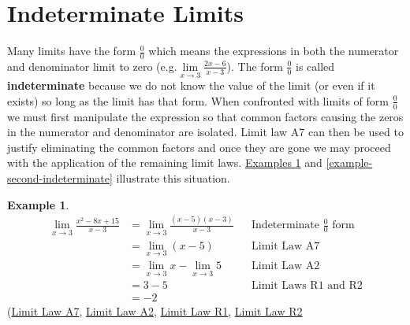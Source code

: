 \documentclass[10pt,oneside,]{book}
\newcommand{\terminology}[1]{\textbf{#1}}
\theoremstyle{plain}
\theoremstyle{definition}
\newtheorem{example}[theorem]{Example}
\numberwithin{equation}{section}
\begin{document}
\section[Indeterminate Limits]{Indeterminate Limits}\label{section-indeterminate-limits}
Many limits have the form \(\frac{0}{0}\) which means the expressions in both the numerator and denominator limit to zero (e.g.\@\(\lim\limits_{x\to3}\frac{2x-6}{x-3}\)). The form \(\frac{0}{0}\) is called \terminology{indeterminate} because we do not know the value of the limit (or even if it exists) so long as the limit has that form. When confronted with limits of form \(\frac{0}{0}\) we must first manipulate the expression so that common factors causing the zeros in the numerator and denominator are isolated. Limit law A7 can then be used to justify eliminating the common factors and once they are gone we may proceed with the application of the remaining limit laws. \hyperref[example-first-indeterminate]{Examples \ref{example-first-indeterminate}} and \hyperref[example-second-indeterminate]{\ref{example-second-indeterminate}} illustrate this situation.%
\begin{example}\label{example-first-indeterminate}
\begin{align*}
\lim_{x\to3}\frac{x^2-8x+15}{x-3}&=\lim_{x\to3}\frac{(x-5)(x-3)}{x-3}&&\text{Indeterminate $\frac{0}{0}$ form}\\
&=\lim_{x\to3}(x-5)&&\text{Limit Law A7}\\
&=\lim_{x\to3}x-\lim_{x\to3}5&&\text{Limit Law A2}\\
&=3-5&&\text{Limit Laws R1 and R2}\\
&=-2
\end{align*}(\hyperref[lla7]{Limit Law A7}, \hyperref[lla2]{Limit Law A2}, \hyperref[llr1]{Limit Law R1}, \hyperref[llr2]{Limit Law R2}%
\end{example}
\end{document}

